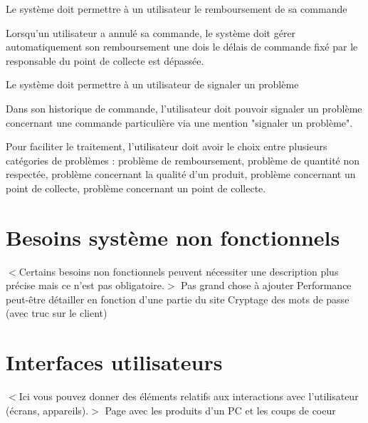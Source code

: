 \begin{reqf}{Le système doit permettre à un utilisateur le remboursement de sa commande}
\item Lorsqu'un utilisateur a annulé sa commande, le système doit gérer automatiquement son remboursement une dois le délais de commande fixé par le responsable du point de collecte est dépassée.
\end{reqf}

\begin{reqf}{Le système doit permettre à un utilisateur de signaler un problème}
\item Dans son historique de commande, l'utilisateur doit pouvoir signaler un problème concernant une commande particulière via une mention "signaler un problème".
\item Pour faciliter le traitement, l'utilisateur doit avoir le choix entre plusieurs catégories de problèmes : problème de remboursement, problème de quantité non respectée, problème concernant la qualité d'un produit, problème concernant un point de collecte, problème concernant un point de collecte.
\end{reqf}





\section{Besoins système non fonctionnels}
$<$Certains besoins non fonctionnels peuvent nécessiter une description plus précise mais ce n'est pas obligatoire.$>$
Pas grand chose à ajouter
Performance peut-être détailler en fonction d'une partie du site
Cryptage des mots de passe (avec truc sur le client)


\section{Interfaces utilisateurs}
$<$Ici vous pouvez donner des éléments relatifs aux interactions avec l'utilisateur (écrans, appareils).$>$
Page avec les produits d'un PC et les coups de coeur